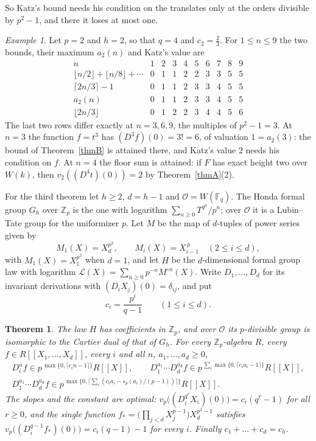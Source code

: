 \documentclass[11pt]{amsart}
\newtheorem{theorem}{Theorem}
\theoremstyle{definition}
\theoremstyle{remark}
\newtheorem{example}[thm]{Example}
\newcommand{\Z}{\mathbb Z}
\newcommand{\F}{\mathbb F}
\newcommand{\vp}{v_p}
\begin{document}
So Katz's bound needs his condition on the translates only at the orders divisible by $p^2-1$, and there it loses at most one.

\begin{example}\label{ex:two}
Let $p=2$ and $h=2$, so that $q=4$ and $c_2=\frac23$. For $1\le n\le9$ the two bounds, their maximum $a_2(n)$ and Katz's value are
\[
\begin{array}{l|ccccccccc}
n&1&2&3&4&5&6&7&8&9\\ \hline
\lfloor n/2\rfloor+\lfloor n/8\rfloor+\cdots&0&1&1&2&2&3&3&5&5\\
\lceil 2n/3\rceil-1&0&1&1&2&3&3&4&5&5\\
a_2(n)&0&1&1&2&3&3&4&5&5\\
\lfloor 2n/3\rfloor&0&1&2&2&3&4&4&5&6
\end{array}
\]
The last two rows differ exactly at $n=3,6,9$, the multiples of $p^2-1=3$. At $n=3$ the function $f=t^3$ has $(D^3f)(0)=3!=6$, of valuation $1=a_2(3)$: the bound of Theorem~\ref{thmB} is attained there, and Katz's value $2$ needs his condition on $f$. At $n=4$ the floor sum is attained: if $F$ has exact height two over $W(k)$, then $v_2((D^4t)(0))=2$ by Theorem~\ref{thmA}(2).
\end{example}

For the third theorem let $h\ge2$, $d=h-1$ and $\mathcal O=W(\F_q)$. The Honda formal group $G_h$ over $\Z_p$ is the one with logarithm $\sum_{n\ge0}T^{q^n}/p^n$; over $\mathcal O$ it is a Lubin--Tate group for the uniformizer $p$. Let $M$ be the map of $d$-tuples of power series given by
\[
 M_1(X)=X_d^{p^2},\qquad M_i(X)=X_{i-1}^{\,p}\quad(2\le i\le d),
\]
with $M_1(X)=X_1^{p^2}$ when $d=1$, and let $H$ be the $d$-dimensional formal group law with logarithm $\mathcal L(X)=\sum_{n\ge0}p^{-n}M^{\circ n}(X)$. Write $D_1,\dots,D_d$ for its invariant derivations with $(D_iX_j)(0)=\delta_{ij}$, and put
\[
 c_i=\frac{p^i}{q-1}\qquad(1\le i\le d).
\]

\begin{theorem}\label{thmC}
The law $H$ has coefficients in $\Z_p$, and over $\mathcal O$ its $p$-divisible group is isomorphic to the Cartier dual of that of $G_h$. For every $\Z_p$-algebra $R$, every $f\in R[[X_1,\dots,X_d]]$, every $i$ and all $n$, $a_1,\dots,a_d\ge0$,
\begin{gather*}
 D_i^nf\in p^{\,\max\{0,\lceil c_in-1\rceil\}}R[[X]],\qquad
 D_1^{a_1}\cdots D_d^{a_d}f\in p^{\,\sum_i\max\{0,\lceil c_ia_i-1\rceil\}}R[[X]],\\
 D_1^{a_1}\cdots D_d^{a_d}f\in p^{\,\max\{0,\lceil\sum_i(c_ia_i-s_p(a_i)/(p-1))\rceil\}}R[[X]].
\end{gather*}
The slopes and the constant are optimal: $\vp\bigl((D_i^{q^r}X_i)(0)\bigr)=c_i(q^r-1)$ for all $r\ge0$, and the single function $f_*=\bigl(\prod_{j<d}X_j^{p-1}\bigr)X_d^{p^2-1}$ satisfies $\vp\bigl((D_i^{q-1}f_*)(0)\bigr)=c_i(q-1)-1$ for every $i$. Finally $c_1+\dots+c_d=c_h$.
\end{theorem}
\end{document}
